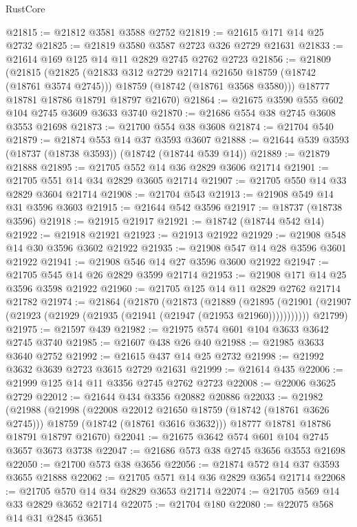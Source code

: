 \begin{lexlean}{RustCore}
\begin{coremodule}
@21815 := @21812 @3581 @3588 @2752
@21819 := @21615 @171 @14 @25 @2732
@21825 := @21819 @3580 @3587 @2723 @326 @2729 @21631
@21833 := @21614 @169 @125 @14 @11 @2829 @2745 @2762 @2723
@21856 := @21809
    (@21815
      (@21825
        (@21833 @312 @2729 @21714 @21650 @18759 (@18742 (@18761 @3574 @2745)))
        @18759
        (@18742 (@18761 @3568 @3580)))
      @18777
      @18781
      @18786
      @18791
      @18797
      @21670)
@21864 := @21675 @3590 @555 @602 @104 @2745 @3609 @3633 @3740
@21870 := @21686 @554 @38 @2745 @3608 @3553 @21698
@21873 := @21700 @554 @38 @3608
@21874 := @21704 @540
@21879 := @21874 @553 @14 @37 @3593 @3607
@21888 := @21644 @539 @3593 (@18737 (@18738 @3593)) (@18742 (@18744 @539 @14))
@21889 := @21879 @21888
@21895 := @21705 @552 @14 @36 @2829 @3606 @21714
@21901 := @21705 @551 @14 @34 @2829 @3605 @21714
@21907 := @21705 @550 @14 @33 @2829 @3604 @21714
@21908 := @21704 @543
@21913 := @21908 @549 @14 @31 @3596 @3603
@21915 := @21644 @542 @3596
@21917 := @18737 (@18738 @3596)
@21918 := @21915 @21917
@21921 := @18742 (@18744 @542 @14)
@21922 := @21918 @21921
@21923 := @21913 @21922
@21929 := @21908 @548 @14 @30 @3596 @3602 @21922
@21935 := @21908 @547 @14 @28 @3596 @3601 @21922
@21941 := @21908 @546 @14 @27 @3596 @3600 @21922
@21947 := @21705 @545 @14 @26 @2829 @3599 @21714
@21953 := @21908 @171 @14 @25 @3596 @3598 @21922
@21960 := @21705 @125 @14 @11 @2829 @2762 @21714 @21782
@21974 := @21864
    (@21870
      (@21873
        (@21889
          (@21895 (@21901 (@21907 (@21923 (@21929 (@21935 (@21941 (@21947 (@21953 @21960)))))))))))
      @21799)
@21975 := @21597 @439
@21982 := @21975 @574 @601 @104 @3633 @3642 @2745 @3740
@21985 := @21607 @438 @26 @40
@21988 := @21985 @3633 @3640 @2752
@21992 := @21615 @437 @14 @25 @2732
@21998 := @21992 @3632 @3639 @2723 @3615 @2729 @21631
@21999 := @21614 @435
@22006 := @21999 @125 @14 @11 @3356 @2745 @2762 @2723
@22008 := @22006 @3625 @2729
@22012 := @21644 @434 @3356 @20882 @20886
@22033 := @21982
    (@21988
      (@21998
        (@22008 @22012 @21650 @18759 (@18742 (@18761 @3626 @2745)))
        @18759
        (@18742 (@18761 @3616 @3632)))
      @18777
      @18781
      @18786
      @18791
      @18797
      @21670)
@22041 := @21675 @3642 @574 @601 @104 @2745 @3657 @3673 @3738
@22047 := @21686 @573 @38 @2745 @3656 @3553 @21698
@22050 := @21700 @573 @38 @3656
@22056 := @21874 @572 @14 @37 @3593 @3655 @21888
@22062 := @21705 @571 @14 @36 @2829 @3654 @21714
@22068 := @21705 @570 @14 @34 @2829 @3653 @21714
@22074 := @21705 @569 @14 @33 @2829 @3652 @21714
@22075 := @21704 @180
@22080 := @22075 @568 @14 @31 @2845 @3651

\end{coremodule}
\end{lexlean}
